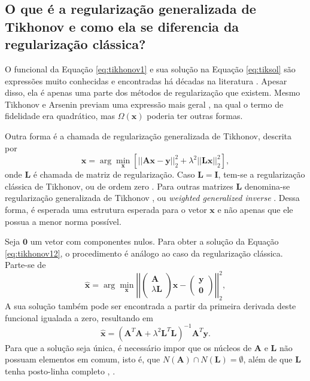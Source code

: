 \subsection{O que é a regularização generalizada de Tikhonov e como ela se diferencia da regularização clássica?}\label{sec:tikhgene}


O funcional da Equação \eqref{eq:tikhonov1} e sua solução na Equação \eqref{eq:tiksol} são expressões muito conhecidas e encontradas há décadas na literatura \cite[pág. 103]{tikhonov1977solutions}.  Apesar disso, ela é apenas uma parte dos métodos de regularização que existem. Mesmo Tikhonov e Arsenin previam uma expressão mais geral \cite[pág. 57]{tikhonov1977solutions}, na qual o termo de fidelidade era quadrático, mas $\Omega(\mathbf{x})$ poderia ter outras formas. 

Outra forma é a chamada de regularização generalizada de Tikhonov, descrita por
\begin{equation}
\hat{\mathbf{x}} = \arg\min\limits_{\mathbf{x}} \left[ \vert \vert \mathbf{A} \mathbf{x} - \mathbf{y} \vert \vert^2_2 + \lambda^2 \vert \vert \mathbf{L} \mathbf{x} \vert \vert_2^2 \right],
\label{eq:tikhonov12}
\end{equation}
onde $ \mathbf{L} $ é chamada de matriz de regularização. Caso $ \mathbf{L} = \mathbf{I} $, tem-se a regularização clássica de Tikhonov, ou de ordem zero \cite[pág. 104]{aster2019parameter}. Para outras matrizes $\mathbf{L}$ denomina-se regularização generalizada de Tikhonov \cite[pág. 171]{hansen2010discrete}, ou \textit{weighted generalized inverse} \cite[pág. 197]{engl1996regularization}. Dessa forma, é esperada uma estrutura esperada para o vetor $\mathbf{x}$ e não apenas que ele possua a menor norma possível. 

Seja $\mathbf{0}$ um vetor com componentes nulos. Para obter a solução da Equação \eqref{eq:tikhonov12}, o procedimento é análogo ao caso da regularização clássica. Parte-se de
\begin{equation}
\hat{\mathbf{x}} = \arg\min\limits_{\mathbf{x}} 
\left|\left|
\begin{pmatrix}
\mathbf{A}\\ 
\lambda \textbf{L}\\ 
\end{pmatrix}\mathbf{x} - \begin{pmatrix}
\mathbf{y}\\ 
\mathbf{0}
\end{pmatrix} \right| \right|^2_2,
\label{eq:tikhonov23}
\end{equation} 
A sua solução também pode ser encontrada a partir da primeira derivada deste funcional igualada a zero, resultando em \cite[pág. 61]{hansen2010discrete} 
\begin{equation}
\hat{\mathbf{x}} =\left( \mathbf{A}^T \mathbf{A} + \lambda^2 \mathbf{L}^T \mathbf{L} \right)^{-1} \mathbf{A}^T \mathbf{y}.
\label{eq:tiksolgen}
\end{equation}
Para que a solução seja única, é necessário impor que os núcleos de $\mathbf{A}$ e $\mathbf{L}$ não possuam elementos em comum, isto é, que $N(\mathbf{A}) \cap N(\mathbf{L}) = \emptyset$, além de que $\mathbf{L}$ tenha posto-linha completo  \cite[pág. 104]{aster2019parameter}, \cite[Seção 2.1.2]{Hansen1998}.  

